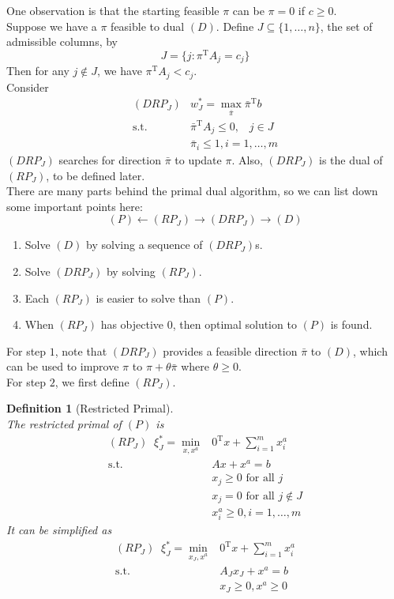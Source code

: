 \documentclass[12pt]{article}
\newcommand{\st}{\mathrm{s.t.}}
\newcommand{\T}{\mathrm{T}}
\newtheorem{definition}{Definition}[section]
\theoremstyle{definition}
\begin{document}
One observation is that the starting feasible $\pi$ can be $\pi=0$ if $c\geq 0$.\\
Suppose we have a $\pi$ feasible to dual $(D)$. Define $J\subseteq \{1,\ldots, n\}$, the set of admissible columns, by
\[
J=\{j:\pi^\T A_j=c_j\}
\] 
Then for any $j\not\in J$, we have $\pi^\T A_j< c_j$.\\
Consider 
\begin{align*}
(DRP_J) & w_J^\ast = \max_{\bar{\pi}} \bar{\pi}^\T b\\
\st &\bar{\pi}^\T A_j\leq 0, \;\;\; j\in J\\
& \bar{\pi}_i\leq 1, i=1,\ldots, m
\end{align*}
$(DRP_J)$ searches for direction $\bar{\pi}$ to update $\pi$. Also, $(DRP_J)$ is the dual of $(RP_J)$, to be defined later. \\
There are many parts behind the primal dual algorithm, so we can list down some important points here:
\[
(P)\leftarrow (RP_J)\rightarrow (DRP_J) \rightarrow (D)
\]
\begin{enumerate}
  \item Solve $(D)$ by solving a sequence of $(DRP_J)$s.
  \item Solve $(DRP_J)$ by solving $(RP_J)$.
  \item Each $(RP_J)$ is easier to solve than $(P)$.
  \item When $(RP_J)$ has objective $0$, then optimal solution to $(P)$ is found.
\end{enumerate} 
For step $1$, note that $(DRP_J)$ provides a feasible direction $\bar{\pi}$ to $(D)$, which can be used to improve $\pi$ to $\pi+\theta\bar{\pi}$ where $\theta\geq 0$.\\
For step $2$, we first define $(RP_J)$. 
\begin{definition}[Restricted Primal]
\hfill\\\normalfont The restricted primal of $(P)$ is
\begin{align*}
(RP_J)\;\;\xi_J^\ast = \min_{x,x^a}& 0^\T x+\sum_{i=1}^m x_i^a\\
\st&Ax+x^a =b\\
&x_j\geq 0 \text{ for all }j\\
&x_j=0\text{ for all }j\not\in J\\
&x_i^a\geq 0, i=1,\ldots, m
\end{align*}
It can be simplified as
\begin{align*}
(RP_J)\;\;\xi_J^\ast = \min_{x_J,x^a}& 0^\T x+\sum_{i=1}^m x_i^a\\
\st&A_Jx_J+x^a =b\\
&x_J\geq 0, x^a\geq 0
\end{align*}
\end{definition}
\end{document}
